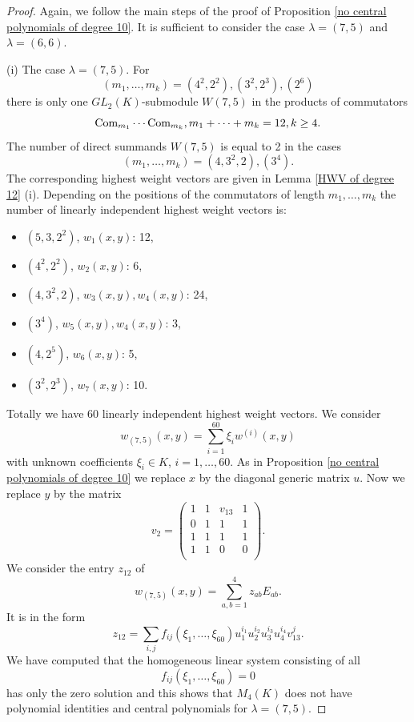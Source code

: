 \documentclass[12pt]{amsart}
\theoremstyle{definition}
\begin{document}
\begin{proof}
Again, we follow the main steps of the proof of Proposition \ref{no central polynomials of degree 10}.
It is sufficient to consider the case $\lambda=(7,5)$ and $\lambda=(6,6)$.

(i) The case $\lambda=(7,5)$. For
\[
(m_1,\ldots,m_k)=(4^2,2^2),(3^2,2^3),(2^6)
\]
there is only one $GL_2(K)$-submodule $W(7,5)$ in the products of commutators
\[
\text{\rm Com}_{m_1}\cdots\text{\rm Com}_{m_k},m_1+\cdots+m_k=12,k\geq 4.
\]
The number of direct summands $W(7,5)$ is equal to 2 in the cases
\[
(m_1,\ldots,m_k)=(4,3^2,2),(3^4).
\]
The corresponding highest weight vectors are given in Lemma \ref{HWV of degree 12} (i).
Depending on the positions of the commutators of length $m_1,\ldots,m_k$ the number of linearly independent highest weight vectors is:
\begin{itemize}
\item $(5,3,2^2)$, $w_1(x,y)$: 12,
\item $(4^2,2^2)$, $w_2(x,y)$: 6,
\item $(4,3^2,2)$, $w_3(x,y),w_4(x,y)$: 24,
\item $(3^4)$, $w_5(x,y),w_4(x,y)$: 3,
\item $(4,2^5)$, $w_6(x,y)$: 5,
\item $(3^2,2^3)$, $w_7(x,y)$: 10.
\end{itemize}
Totally we have 60 linearly independent highest weight vectors.
We consider
\[
w_{(7,5)}(x,y)=\sum_{i=1}^{60}\xi_iw^{(i)}(x,y)
\]
with unknown coefficients $\xi_i\in K$, $i=1,\ldots,60$. As in Proposition \ref{no central polynomials of degree 10}
we replace $x$ by the diagonal generic matrix $u$. Now we replace $y$ by the matrix
\[
v_2=\left(\begin{matrix}1&1&v_{13}&1\\
0&1&1&1\\
1&1&1&1\\
1&1&0&0\\
\end{matrix}\right).
\]
We consider the entry $z_{12}$ of
\[
w_{(7,5)}(x,y)=\sum_{a,b=1}^4z_{ab}E_{ab}.
\]
It is in the form
\[
z_{12}=\sum_{i,j}f_{ij}(\xi_1,\ldots,\xi_{60})u_1^{i_1}u_2^{i_2}u_3^{i_3}u_4^{i_4}v_{13}^j.
\]
We have computed that the homogeneous linear system consisting of all
\[
f_{ij}(\xi_1,\ldots,\xi_{60})=0
\]
has only the zero solution and this shows that $M_4(K)$ does not have polynomial identities and central polynomials for $\lambda=(7,5)$.


\end{proof}
\end{document}
